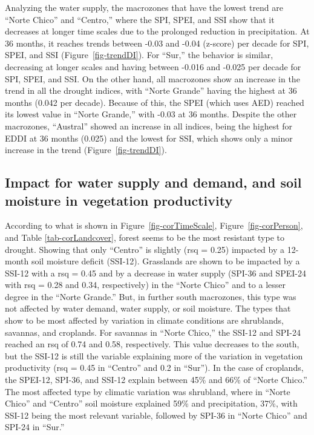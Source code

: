 \documentclass[
  authoryear,
  preprint,
  3p,
  onecolumn]{elsarticle}
\begin{document}
Analyzing the water supply, the macrozones that have the lowest trend
are ``Norte Chico'' and ``Centro,'' where the SPI, SPEI, and SSI show
that it decreases at longer time scales due to the prolonged reduction
in precipitation. At 36 months, it reaches trends between -0.03 and
-0.04 (z-score) per decade for SPI, SPEI, and SSI
(Figure~\ref{fig-trendDI}). For ``Sur,'' the behavior is similar,
decreasing at longer scales and having between -0.016 and -0.025 per
decade for SPI, SPEI, and SSI. On the other hand, all macrozones show an
increase in the trend in all the drought indices, with ``Norte Grande''
having the highest at 36 months (0.042 per decade). Because of this, the
SPEI (which uses AED) reached its lowest value in ``Norte Grande,'' with
-0.03 at 36 months. Despite the other macrozones, ``Austral'' showed an
increase in all indices, being the highest for EDDI at 36 months (0.025)
and the lowest for SSI, which shows only a minor increase in the trend
(Figure~\ref{fig-trendDI}).

\hypertarget{impact-for-water-supply-and-demand-and-soil-moisture-in-vegetation-productivity}{%
\subsection{Impact for water supply and demand, and soil moisture in
vegetation
productivity}\label{impact-for-water-supply-and-demand-and-soil-moisture-in-vegetation-productivity}}

According to what is shown in Figure~\ref{fig-corTimeScale},
Figure~\ref{fig-corPerson}, and Table \ref{tab-corLandcover}, forest
seems to be the most resistant type to drought. Showing that only
``Centro'' is slightly (rsq = 0.25) impacted by a 12-month soil moisture
deficit (SSI-12). Grasslands are shown to be impacted by a SSI-12 with a
rsq = 0.45 and by a decrease in water supply (SPI-36 and SPEI-24 with
rsq = 0.28 and 0.34, respectively) in the ``Norte Chico'' and to a
lesser degree in the ``Norte Grande.'' But, in further south macrozones,
this type was not affected by water demand, water supply, or soil
moisture. The types that show to be most affected by variation in
climate conditions are shrublands, savannas, and croplands. For savannas
in ``Norte Chico,'' the SSI-12 and SPI-24 reached an rsq of 0.74 and
0.58, respectively. This value decreases to the south, but the SSI-12 is
still the variable explaining more of the variation in vegetation
productivity (rsq = 0.45 in ``Centro'' and 0.2 in ``Sur''). In the case
of croplands, the SPEI-12, SPI-36, and SSI-12 explain between 45\% and
66\% of ``Norte Chico.'' The most affected type by climatic variation
was shrubland, where in ``Norte Chico'' and ``Centro'' soil moisture
explained 59\% and precipitation, 37\%, with SSI-12 being the most
relevant variable, followed by SPI-36 in ``Norte Chico'' and SPI-24 in
``Sur.''
\end{document}
